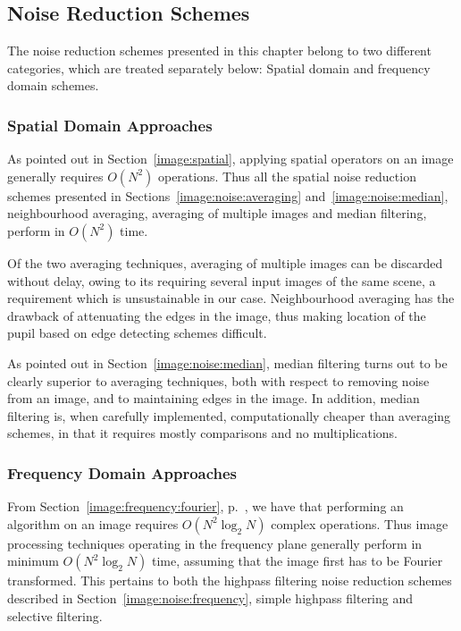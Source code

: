 \subsection{Noise Reduction Schemes}
\label{eval:eval:noise}

The noise reduction schemes presented in this chapter belong to two
different categories, which are treated separately below: Spatial
domain and frequency domain schemes.

\subsubsection{Spatial Domain Approaches}

As pointed out in Section~\ref{image:spatial}, applying spatial
operators on an image generally requires $O(N^{2})$ operations.  Thus
all the spatial noise reduction schemes presented in
Sections~\ref{image:noise:averaging} and~\ref{image:noise:median},
neighbourhood averaging, averaging of multiple images and median
filtering, perform in $O(N^{2})$ time.

Of the two averaging techniques, averaging of multiple images can be
discarded without delay, owing to its requiring several input images
of the same scene, a requirement which is unsustainable in our case.
Neighbourhood averaging has the drawback of attenuating the edges in
the image, thus making location of the pupil based on edge detecting
schemes difficult.

As pointed out in Section~\ref{image:noise:median}, median filtering
turns out to be clearly superior to averaging techniques, both with
respect to removing noise from an image, and to maintaining edges in
the image.  In addition, median filtering is, when carefully
implemented, computationally cheaper than averaging schemes, in that
it requires mostly comparisons and no multiplications.

\subsubsection{Frequency Domain Approaches}

From Section~\ref{image:frequency:fourier}, p.~\pageref{pg:fft:O}, we
have that performing an {\fft} algorithm on an image requires
$O(N^{2}\log_{2}N)$ complex operations.  Thus image processing
techniques operating in the frequency plane generally perform in
minimum $O(N^{2}\log_{2}N)$ time, assuming that the image first has to
be Fourier transformed.  This pertains to both the highpass filtering
noise reduction schemes described in
Section~\ref{image:noise:frequency}, simple highpass filtering and
selective filtering.

